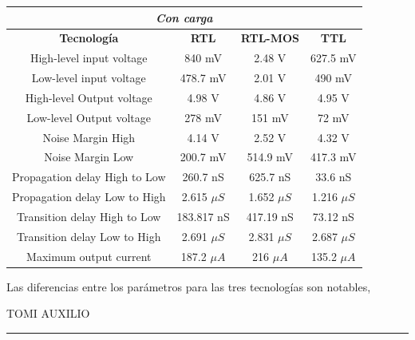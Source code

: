 \begin{table}[H]
\centering
\begin{tabular}{c|ccc}
\hline
\multicolumn{4}{|c|}{\textit{Con carga}}                                                                         \\ \hline
\multicolumn{1}{|c|}{\textbf{Tecnología}} & \textbf{RTL}  & \textbf{RTL-MOS} & \multicolumn{1}{c|}{\textbf{TTL}} \\ \hline
High-level input voltage                  & 840 mV        & 2.48 V           & 627.5 mV                          \\
Low-level input voltage                   & 478.7 mV      & 2.01 V         &    490 mV                         \\
High-level Output voltage                 & 4.98 V        & 4.86 V          & 4.95 V                            \\
Low-level Output voltage                  & 278 mV        & 151 mV           & 72 mV                             \\
Noise Margin High                         & 4.14 V        & 2.52 V           & 4.32 V                            \\
Noise Margin Low                          & 200.7 mV      & 514.9 mV         & 417.3 mV                          \\
Propagation delay High to Low             & 260.7 nS      & 625.7 nS         & 33.6 nS                           \\
Propagation delay Low to High             & 2.615 $\mu S$ & 1.652 $\mu S$    & 1.216 $\mu S$                     \\
Transition delay High to Low              & 183.817 nS    & 417.19 nS        & 73.12 nS                          \\
Transition delay Low to High              & 2.691 $\mu S$ & 2.831 $\mu S$    & 2.687 $\mu S$                     \\
Maximum output current                    &  187.2 $\mu A$             &     216 $\mu A$             &   135.2 $\mu A$                               
\end{tabular}
\end{table}
 

Las diferencias entre los parámetros para las tres tecnologías son notables,
{\begin{center}\color{red} \begin{huge}
TOMI AUXILIO \end{huge} \rule{\linewidth}{0.5mm}\end{center} }